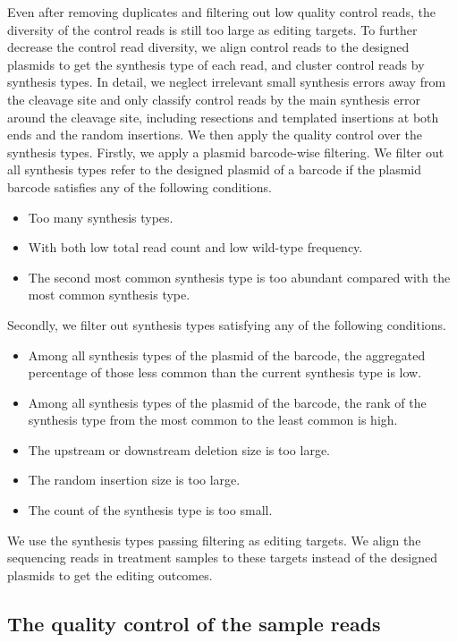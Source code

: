 \documentclass{article}
\begin{document}
Even after removing duplicates and filtering out low quality control reads, the diversity of the control reads is still too large as editing targets. To further decrease the control read diversity, we align control reads to the designed plasmids to get the synthesis type of each read, and cluster control reads by synthesis types. In detail, we neglect irrelevant small synthesis errors away from the cleavage site and only classify control reads by the main synthesis error around the cleavage site, including resections and templated insertions at both ends and the random insertions. We then apply the quality control over the synthesis types. Firstly, we apply a plasmid barcode-wise filtering. We filter out all synthesis types refer to the designed plasmid of a barcode if the plasmid barcode satisfies any of the following conditions.
\begin{itemize}
  \item Too many synthesis types.
  \item With both low total read count and low wild-type frequency.
  \item The second most common synthesis type is too abundant compared with the most common synthesis type.
\end{itemize}
Secondly, we filter out synthesis types satisfying any of the following conditions.
\begin{itemize}
  \item Among all synthesis types of the plasmid of the barcode, the aggregated percentage of those less common than the current synthesis type is low.
  \item Among all synthesis types of the plasmid of the barcode, the rank of the synthesis type from the most common to the least common is high.
  \item The upstream or downstream deletion size is too large.
  \item The random insertion size is too large.
  \item The count of the synthesis type is too small.
\end{itemize}

We use the synthesis types passing filtering as editing targets. We align the sequencing reads in treatment samples to these targets instead of the designed plasmids to get the editing outcomes.


\subsection{The quality control of the sample reads}
\end{document}
